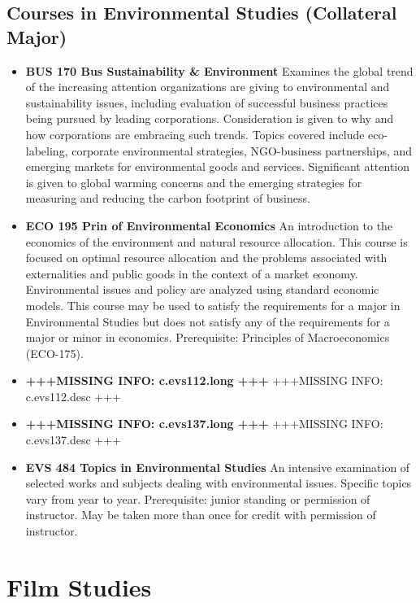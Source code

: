 \documentclass[
  letterpaper,
]{scrbook}
\providecommand{\tightlist}{%
  \setlength{\itemsep}{0pt}\setlength{\parskip}{0pt}}
\begin{document}
\hypertarget{courses-in-environmental-studies-collateral-major}{%
\subsection{Courses in Environmental Studies (Collateral
Major)}\label{courses-in-environmental-studies-collateral-major}}

\begin{itemize}
\tightlist
\item
  \textbf{BUS 170 Bus Sustainability \& Environment} Examines the global
  trend of the increasing attention organizations are giving to
  environmental and sustainability issues, including evaluation of
  successful business practices being pursued by leading corporations.
  Consideration is given to why and how corporations are embracing such
  trends. Topics covered include eco-labeling, corporate environmental
  strategies, NGO-business partnerships, and emerging markets for
  environmental goods and services. Significant attention is given to
  global warming concerns and the emerging strategies for measuring and
  reducing the carbon footprint of business.
\item
  \textbf{ECO 195 Prin of Environmental Economics} An introduction to
  the economics of the environment and natural resource allocation. This
  course is focused on optimal resource allocation and the problems
  associated with externalities and public goods in the context of a
  market economy. Environmental issues and policy are analyzed using
  standard economic models. This course may be used to satisfy the
  requirements for a major in Environmental Studies but does not satisfy
  any of the requirements for a major or minor in economics.
  Prerequisite: Principles of Macroeconomics (ECO-175).
\item
  \textbf{+++MISSING INFO: c.evs112.long +++} +++MISSING INFO:
  c.evs112.desc +++
\item
  \textbf{+++MISSING INFO: c.evs137.long +++} +++MISSING INFO:
  c.evs137.desc +++
\item
  \textbf{EVS 484 Topics in Environmental Studies} An intensive
  examination of selected works and subjects dealing with environmental
  issues. Specific topics vary from year to year. Prerequisite: junior
  standing or permission of instructor. May be taken more than once for
  credit with permission of instructor.
\end{itemize}

\hypertarget{sec-film-studies}{%
\section{Film Studies}\label{sec-film-studies}}
\end{document}
